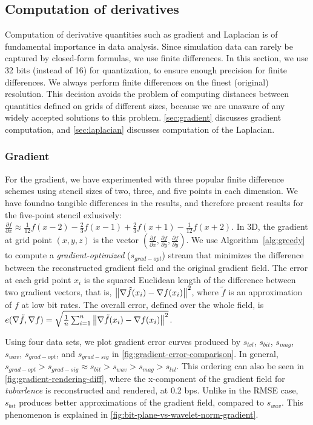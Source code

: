 \subsection{Computation of derivatives}\label{sec:derivatives}
Computation of derivative quantities such as gradient and Laplacian is of fundamental importance in
data analysis. Since simulation data can rarely be captured by closed-form formulas, we use finite
differences. In this section, we use 32 bits (instead of 16) for quantization, to ensure enough
precision for finite differences. We always perform finite differences on the finest (original)
resolution. This decision avoids the problem of computing distances between quantities defined on
grids of different sizes, because we are unaware of any widely accepted solutions to this problem.
\autoref{sec:gradient} discusses gradient computation, and \autoref{sec:laplacian} discusses
computation of the Laplacian.

\subsubsection{Gradient}\label{sec:gradient}
For the gradient, we have experimented with three popular finite difference schemes using stencil
sizes of two, three, and five points in each dimension. We have foundno tangible differences in the
results, and therefore present results for the five-point stencil exlusively: $\frac{\partial
f}{\partial x}\approx \frac{1}{12}f(x-2)-\frac{2}{3}f(x-1)+\frac{2}{3}f(x+1)-\frac{1}{12}f(x+2)$. In
3D, the gradient at grid point $(x,y,z)$ is the vector $(\frac{\partial f}{\partial
x},\frac{\partial f}{\partial y}, \frac{\partial f}{\partial y})$. We use Algorithm~\ref{alg:greedy}
to compute a \emph{gradient-optimized} ($s_{grad-opt}$) stream that minimizes the difference between
the reconstructed gradient field and the original gradient field. The error at each grid point $x_i$
is the squared Euclidean length of the difference between two gradient vectors, that is,
$\left\lVert\nabla \tilde{f}(x_i)-\nabla f(x_i)\right\rVert^2$, where $\tilde{f}$ is an approximation of $f$
at low bit rates. The overall error, defined over the whole field, is $e(\nabla \tilde{f},\nabla
f)=\sqrt{\frac{1}{n}\sum_{i=1}^{n}{\left\lVert\nabla \tilde{f}(x_i)-\nabla f(x_i)\right\rVert^2}}$.

Using four data sets, we plot gradient error curves produced by $s_{lvl}$, $s_{bit}$, $s_{mag}$,
$s_{wav}$, $s_{grad-opt}$, and $s_{grad-sig}$ in \autoref{fig:gradient-error-comparison}. In
general, $s_{grad-opt} > s_{grad-sig} \approx s_{bit} > s_{wav} > s_{mag} > s_{lvl}$. This ordering
can also be seen in \autoref{fig:gradient-rendering-diff}, where the x-component of the gradient
field for \emph{tuburlence} is reconstructed and rendered, at 0.2 bps. Unlike in the RMSE case,
$s_{bit}$ produces better approximations of the gradient field, compared to $s_{wav}$. This
phenomenon is explained in \autoref{fig:bit-plane-vs-wavelet-norm-gradient}.

